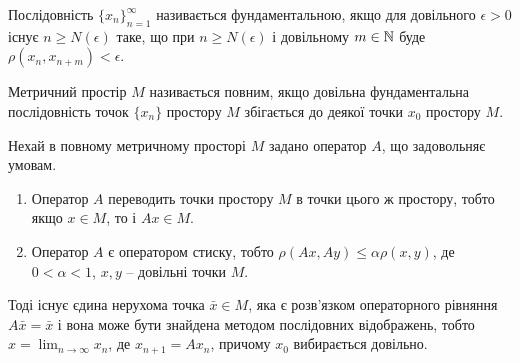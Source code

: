 \begin{definition} 
	Послідовність $\{x_n\}_{n=1}^\infty$ називається фундаментальною, якщо для довільного $\epsilon > 0$ існує $n \ge N(\epsilon)$ таке, що при $n \ge N(\epsilon)$ і довільному $m\in\mathbb{N}$ буде $\rho(x_n,x_{n+m}) < \epsilon$.
\end{definition}
\begin{definition} 
	Метричний простір $M$ називається повним, якщо довільна фундаментальна послідовність точок $\{x_n\}$ простору $M$ збігається до деякої точки $x_0$ простору $M$.
\end{definition}
\begin{theorem} 
	Нехай в повному метричному просторі $M$ задано оператор $A$, що задовольняє умовам.
	\begin{enumerate}
		\item Оператор $A$ переводить точки простору $M$ в точки цього ж простору, тобто якщо $x\in M$, то і $Ax \in M$.
		\item Оператор $A$ є оператором стиску, тобто $\rho(Ax,Ay)\le\alpha\rho(x,y)$, де $0<\alpha<1$, $x,y$ -- довільні точки $M$. 
	\end{enumerate}
	Тоді існує єдина нерухома точка $\bar x \in M$, яка є розв’язком операторного рівняння $A\bar x=\bar x$ і вона може бути знайдена методом послідовних відображень, тобто $x = \lim_{n\to\infty} x_n$, де $x_{n+1} = A x_n$, причому $x_0$ вибирається довільно.
\end{theorem}
